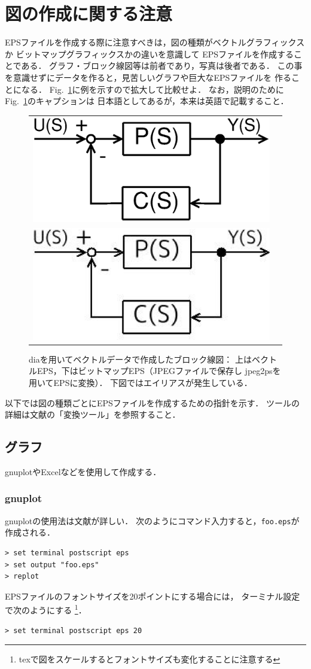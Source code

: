 \documentclass[onecolumn]{jsarticle}
\begin{document}
\section{図の作成に関する注意}
EPSファイルを作成する際に注意すべきは，図の種類がベクトルグラフィックスか
ビットマップグラフィックスかの違いを意識して
EPSファイルを作成することである．
グラフ・ブロック線図等は前者であり，写真は後者である．
この事を意識せずにデータを作ると，見苦しいグラフや巨大なEPSファイルを
作ることになる．
Fig.~\ref{fig:ComparingEPS}に例を示すので拡大して比較せよ．
なお，説明のためにFig.~\ref{fig:ComparingEPS}のキャプションは
日本語としてあるが，本来は英語で記載すること．
%
\begin{figure}[tb]
  \centering
  \begin{tabular}[t]{cc}
    \includegraphics[width=0.65\linewidth]{fig/Feedback.eps} \\
    \includegraphics[width=0.65\linewidth]{fig/Feedback-jpeg.eps}
  \end{tabular}
  \caption{diaを用いてベクトルデータで作成したブロック線図：
    上はベクトルEPS，下はビットマップEPS（JPEGファイルで保存し
    jpeg2psを用いてEPSに変換）．
    下図ではエイリアスが発生している．}
  \label{fig:ComparingEPS}
\end{figure}

以下では図の種類ごとにEPSファイルを作成するための指針を示す．
ツールの詳細は文献\cite{TeXWiki}の「変換ツール」を参照すること．

\subsection{グラフ}
gnuplotやExcelなどを使用して作成する．
\subsubsection{gnuplot}
gnuplotの使用法は文献\cite{GnuplotPerfect,GnuplotTP}が詳しい．
次のようにコマンド入力すると，\texttt{foo.eps}が作成される．
\begin{verbatim}
> set terminal postscript eps
> set output "foo.eps"
> replot
\end{verbatim}
EPSファイルのフォントサイズを20ポイントにする場合には，
ターミナル設定で次のようにする
\footnote{texで図をスケールするとフォントサイズも変化することに注意する}．
\begin{verbatim}
> set terminal postscript eps 20
\end{verbatim}
\end{document}
